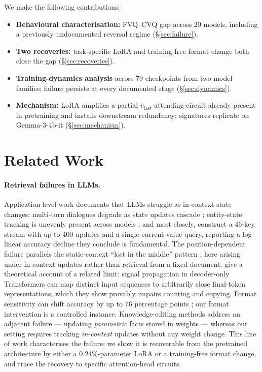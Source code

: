 \documentclass[letterpaper]{article} %
\begin{document}
We make the following contributions:

\begin{itemize}
\item \textbf{Behavioural characterisation:} FVQ--CVQ gap across 20
  models, including a previously undocumented reversal regime
  (\S\ref{sec:failure}).
\item \textbf{Two recoveries:} task-specific LoRA and training-free
  format change both close the gap
  (\S\ref{sec:recoveries}).
\item \textbf{Training-dynamics analysis} across 79 checkpoints from
  two model families; failure persists at every documented stage
  (\S\ref{sec:dynamics}).
\item \textbf{Mechanism:} LoRA amplifies a partial
  $v_{\text{last}}$-attending circuit already present in pretraining
  and installs downstream redundancy; signatures replicate on
  Gemma-3-4b-it (\S\ref{sec:mechanism}).
\end{itemize}

\section{Related Work}
\label{sec:related}

\paragraph{Retrieval failures in LLMs.}
Application-level work documents that LLMs struggle as in-context
state changes: multi-turn dialogues degrade as state updates cascade
\citep{laban2025multiturn}; entity-state tracking is unevenly present
across models \citep{kim2023entity, kim2024code, rezaee2025state};
and most closely, \citet{unable2forget2025} construct a 46-key stream
with up to 400 updates and a single current-value query, reporting
a log-linear accuracy decline they conclude is fundamental. The
position-dependent failure parallels the static-context ``lost in
the middle'' pattern \citep{lostinthemiddle}, here arising under
in-context updates rather than retrieval from a fixed document.
\citet{barbero2024glasses} give a theoretical account of a related
limit: signal propagation in decoder-only Transformers can map
distinct input sequences to arbitrarily close final-token
representations, which they show provably impairs counting and
copying.
Format sensitivity can shift accuracy by up to 76 percentage points
\citep{sclar2024}; our format intervention is a controlled instance.
Knowledge-editing methods \citep{meng2022rome, meng2023memit} address
an adjacent failure --- updating \emph{parametric} facts stored in
weights --- whereas our setting requires tracking \emph{in-context}
updates without any weight change.
This line of work characterises the failure; we show it is
recoverable from the pretrained architecture by either a
0.24\%-parameter LoRA or a training-free format change, and trace
the recovery to specific attention-head circuits.
\end{document}
